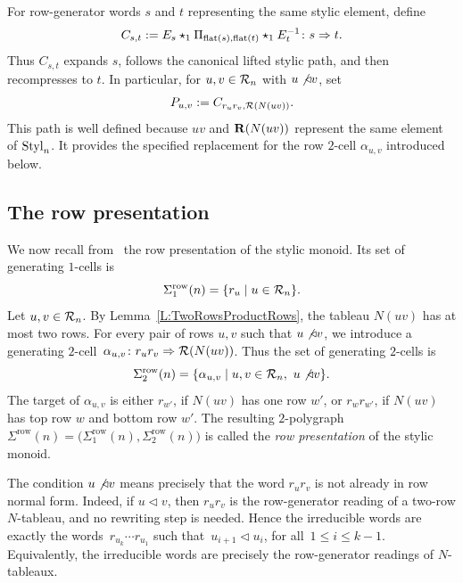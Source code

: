\documentclass[a4paper, twoside, 11pt, english]{article}
\begin{document}
For row-generator words $s$ and $t$ representing the same stylic
element, define
\begin{equation}
\label{Eq:CanonicalPreRowComparison}
C_{s,t}
:=
E_s
\star_1
\Pi_{\operatorname{flat}(s),\operatorname{flat}(t)}
\star_1
E_t^{-1}
\colon
s\Rightarrow t.
\end{equation}
Thus $C_{s,t}$ expands $s$, follows the canonical lifted stylic path,
and then recompresses to $t$.
In particular, for $u,v\in\mathcal{R}_n$ with $u\not\triangleleft v$, set
\begin{equation}
\label{Eq:CanonicalPreRowRowCell}
P_{u,v}
:=
C_{r_ur_v,\mathcal{R}(N(uv))}.
\end{equation}
This path is well defined because $uv$ and $\mathbf{R}(N(uv))$ represent the
same element of $\mathrm{Styl}_n$. It provides the specified replacement for
the row $2$-cell $\alpha_{u,v}$ introduced below.

\subsection{The row presentation}
\label{SS:RowPresentation}

We now recall from~\cite{LuoJinZhangStylic} the row presentation of the stylic
monoid. Its set of generating $1$-cells is
\[
\Sigma^{\mathrm{row}}_1(n)
=
\{r_u\mid u\in\mathcal{R}_n\}.
\]
Let $u,v\in\mathcal{R}_n$. By Lemma~\ref{L:TwoRowsProductRows}, the tableau $N(uv)$ has
at most two rows. For every pair of rows $u,v$ such that $u\not\triangleleft v$,
we introduce a generating $2$-cell~$\alpha_{u,v}\colon r_u r_v \Rightarrow \mathcal{R}(N(uv))$.
Thus the set of generating $2$-cells is
\[
\Sigma^{\mathrm{row}}_2(n)
=
\{\alpha_{u,v}\mid u,v\in\mathcal{R}_n,\ u\not\triangleleft v\}.
\]
The target of $\alpha_{u,v}$ is either $r_{w'}$, if $N(uv)$ has one row $w'$,
or $r_w r_{w'}$, if $N(uv)$ has top row $w$ and bottom row $w'$.
The resulting $2$-polygraph~$\Sigma^{\mathrm{row}}(n)=
\bigl(\Sigma^{\mathrm{row}}_1(n),\Sigma^{\mathrm{row}}_2(n)\bigr)$
is called the \emph{row presentation} of the stylic monoid.

The condition $u\not\triangleleft v$ means precisely that the word $r_ur_v$ is
not already in row normal form. Indeed, if $u\triangleleft v$, then $r_ur_v$ is
the row-generator reading of a two-row $N$-tableau, and no rewriting step is
needed. Hence the irreducible words are exactly the words~$
r_{u_k}\cdots r_{u_1}$ such that~$u_{i+1}\triangleleft u_i$, for all~$1\le i\le k-1$.
Equivalently, the irreducible words are precisely the row-generator readings of
$N$-tableaux.
\end{document}
